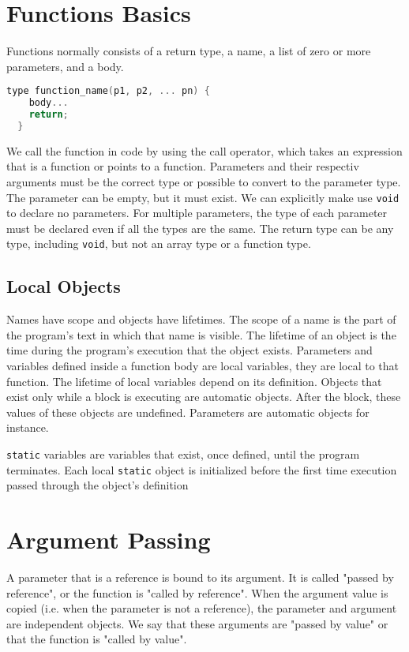 \documentclass[12pt, a4paper]{report}
\begin{document}
\section{Functions Basics}
Functions normally consists of a return type, a name, a list of zero or more parameters, and a body.
\begin{lstlisting}[language=C++]
  type function_name(p1, p2, ... pn) {
    body...
    return;
  }
\end{lstlisting}
We call the function in code by using the call operator, which takes an expression that is a function or points to a function.
Parameters and their respectiv arguments must be the correct type or possible to convert to the parameter type.
The parameter can be empty, but it must exist.
We can explicitly make use \verb|void| to declare no parameters.
For multiple parameters, the type of each parameter must be declared even if all the types are the same.
The return type can be any type, including \verb|void|, but not an array type or a function type.
\subsection{Local Objects}
Names have scope and objects have lifetimes.
The scope of a name is the part of the program's text in which that name is visible.
The lifetime of an object is the time during the program's execution that the object exists.
Parameters and variables defined inside a function body are local variables, they are local to that function.
The lifetime of local variables depend on its definition.
Objects that exist only while a block is executing are automatic objects.
After the block, these values of these objects are undefined.
Parameters are automatic objects for instance.

\verb|static| variables are variables that exist, once defined, until the program terminates.
Each local \verb|static| object is initialized before the first time execution passed through the object's definition
\section{Argument Passing}
A parameter that is a reference is bound to its argument.
It is called "passed by reference", or the function is "called by reference".
When the argument value is copied (i.e. when the parameter is not a reference), the parameter and argument are independent objects.
We say that these arguments are "passed by value" or that the function is "called by value".
\end{document}
